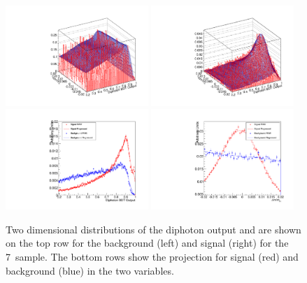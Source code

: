 \begin{figure}
  \includegraphics[width=0.48\textwidth]{selec_and_cats/plots/sideband_bkg_7TeV.pdf}
  \includegraphics[width=0.48\textwidth]{selec_and_cats/plots/sideband_sig_7TeV.pdf} \\
  \includegraphics[width=0.48\textwidth]{selec_and_cats/plots/sideband_diphobdt_7TeV.pdf}
  \includegraphics[width=0.48\textwidth]{selec_and_cats/plots/sideband_dmom_7TeV.pdf} \\
  \caption{Two dimensional distributions of the diphoton \BDT output and \dmom are shown on the top row for the background (left) and signal (right) for the 7~\TeV sample. The bottom rows show the projection for signal (red) and background (blue) in the two variables.}
  \label{fig:sideband_inputs}
\end{figure}


